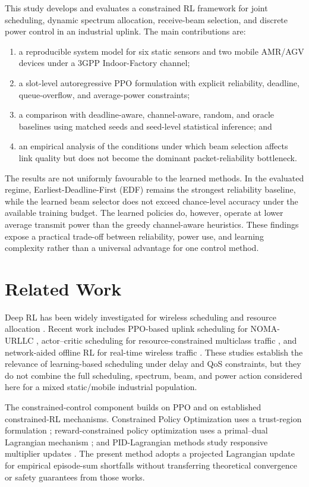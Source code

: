 \documentclass[number]{autarticle}
\begin{document}
This study develops and evaluates a constrained RL framework for joint scheduling, dynamic spectrum allocation, receive-beam selection, and discrete power control in an industrial uplink. The main contributions are:
\begin{enumerate}
\item a reproducible system model for six static sensors and two mobile AMR/AGV devices under a 3GPP Indoor-Factory channel;
\item a slot-level autoregressive PPO formulation with explicit reliability, deadline, queue-overflow, and average-power constraints;
\item a comparison with deadline-aware, channel-aware, random, and oracle baselines using matched seeds and seed-level statistical inference; and
\item an empirical analysis of the conditions under which beam selection affects link quality but does not become the dominant packet-reliability bottleneck.
\end{enumerate}

The results are not uniformly favourable to the learned methods. In the evaluated regime, Earliest-Deadline-First (EDF) remains the strongest reliability baseline, while the learned beam selector does not exceed chance-level accuracy under the available training budget. The learned policies do, however, operate at lower average transmit power than the greedy channel-aware heuristics. These findings expose a practical trade-off between reliability, power use, and learning complexity rather than a universal advantage for one control method.

\section{Related Work}\label{related-work}
Deep RL has been widely investigated for wireless scheduling and resource allocation \cite{luong2019drlsurvey}. Recent work includes PPO-based uplink scheduling for NOMA-URLLC \cite{robaglia2024nomappo}, actor--critic scheduling for resource-constrained multiclass traffic \cite{avranas2023constrained}, and network-aided offline RL for real-time wireless traffic \cite{wan2023naorl}. These studies establish the relevance of learning-based scheduling under delay and QoS constraints, but they do not combine the full scheduling, spectrum, beam, and power action considered here for a mixed static/mobile industrial population.

The constrained-control component builds on PPO \cite{schulman2017ppo} and on established constrained-RL mechanisms. Constrained Policy Optimization uses a trust-region formulation \cite{achiam2017cpo}; reward-constrained policy optimization uses a primal--dual Lagrangian mechanism \cite{tessler2019rcpo}; and PID-Lagrangian methods study responsive multiplier updates \cite{stooke2020pid}. The present method adopts a projected Lagrangian update for empirical episode-sum shortfalls without transferring theoretical convergence or safety guarantees from those works.
\end{document}
